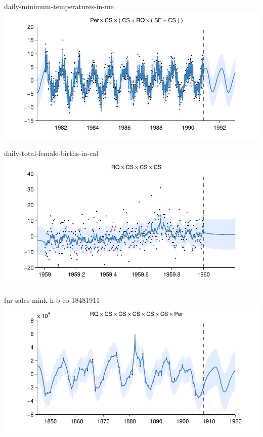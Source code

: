     
\begin{frame}{daily-minimum-temperatures-in-me}
  \center
  \includegraphics[width=1.0\textwidth]{figures/daily-minimum-temperatures-in-me/daily-minimum-temperatures-in-me_all}
\end{frame}  


    
\begin{frame}{daily-total-female-births-in-cal}
  \center
  \includegraphics[width=1.0\textwidth]{figures/daily-total-female-births-in-cal/daily-total-female-births-in-cal_all}
\end{frame}  


    
\begin{frame}{fur-sales-mink-h-b-co-18481911}
  \center
  \includegraphics[width=1.0\textwidth]{figures/fur-sales-mink-h-b-co-18481911/fur-sales-mink-h-b-co-18481911_all}
\end{frame}  


